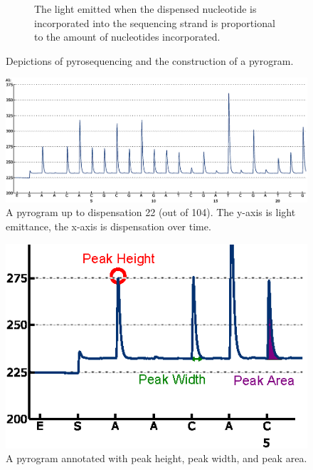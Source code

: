 \documentclass[12pt]{ucthesis}
\begin{document}
\begin{figure}[t]
\begin{subfigure}[t]{0.45\textwidth}
            \caption{The light emitted when the dispensed nucleotide is
                     incorporated into the sequencing strand is proportional to
                     the amount of nucleotides incorporated.}
            \label{fig:incorporated}
         \end{subfigure}
         \caption{Depictions of pyrosequencing and the construction of a
                  pyrogram.}
         \label{fig:pyrosequencing}
      \end{figure}

      \begin{figure}[t]
         \centering
         \includegraphics[width=\columnwidth]{graphics/pyrogram.eps}
         \caption{A pyrogram up to dispensation 22 (out of 104). The y-axis is
                  light emittance, the x-axis is dispensation over time.}
         \label{fig:pyrogram}
      \end{figure}

      \begin{figure}[t]
         \centering
         \includegraphics[width=0.65\columnwidth]{graphics/pyrogram_annotated.eps}
         \caption{A pyrogram annotated with peak height, peak width, and peak area.}
         \label{fig:annotated_pyrogram}
      \end{figure}
\end{document}
